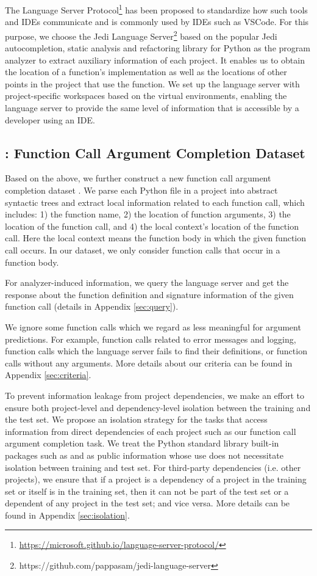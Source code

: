 \ifaaai
The Language Server Protocol\footnote{\url{https://microsoft.github.io/language-server-protocol/}} has been proposed to standardize how such tools and IDEs communicate and is commonly used by IDEs such as VSCode.
\fi
For this purpose, we choose the Jedi Language Server\footnote{https://github.com/pappasam/jedi-language-server} based on the popular Jedi autocompletion, static analysis and refactoring library for Python as the program analyzer to extract auxiliary information of each project. It enables us to obtain the location of a function's implementation as well as the locations of other points in the project that use the function.
We set up the language server with project-specific workspaces based on the virtual environments, enabling the language server to provide the same level of information that is accessible by a developer using an IDE. 



\subsection{\CallArgs: Function Call Argument Completion Dataset}
\label{sec:dataset-callargs}
\ifaaai
Based on the above, we further construct a new function call argument completion dataset \CallArgs. 
\fi
We parse each Python file in a project into abstract syntactic trees and extract local information related to each function call, which includes: 1) the function name, 2) the location of function arguments, 3) the location of the function call, and 4) the local context's location of the function call.
Here the local context means the function body in which the given function call occurs. In our dataset, we only consider function calls that occur in a function body. 

For analyzer-induced information, we query the language server and get the response about the function definition and signature information of the given function call (details in Appendix \ref{sec:query}). 

We ignore some function calls which we regard as less meaningful for argument predictions. 
For example, function calls related to error messages and logging, function calls which the language server fails to find their definitions, or function calls without any arguments. 
More details about our criteria can be found in Appendix \ref{sec:criteria}.

To prevent information leakage from project dependencies,
we make an effort to ensure both project-level and dependency-level isolation between the training and the test set. 
We propose an isolation strategy for the tasks that access information from direct dependencies of each project such as our function call argument completion task.
We treat the Python standard library built-in packages such as  and  as public information whose use does not necessitate isolation between training and test set. 
For third-party dependencies (i.e. other projects), we ensure that if a project is a dependency of a project in the training set or itself is in the training set, then it can not be part of the test set or a dependent of any project in the test set; and vice versa.
More details can be found in Appendix \ref{sec:isolation}.


